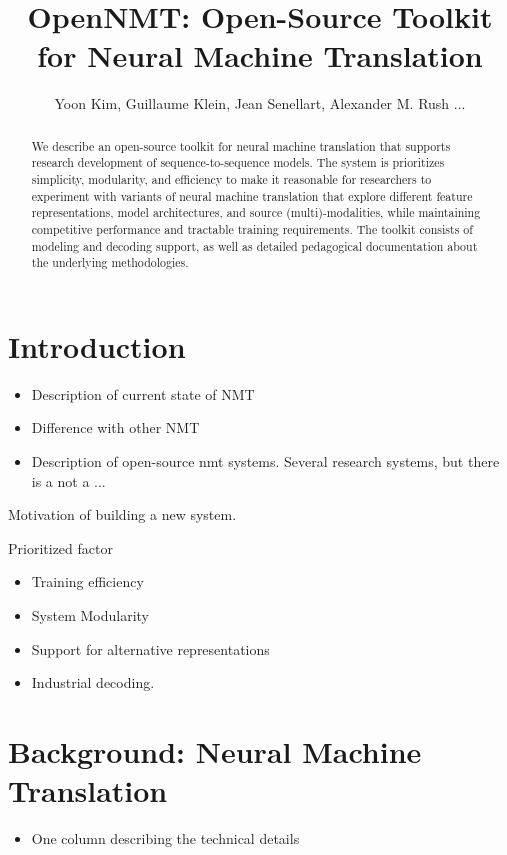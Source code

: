 \documentclass[11pt]{article}
\title{OpenNMT: Open-Source Toolkit for Neural Machine Translation}
\author{Yoon Kim, Guillaume Klein, Jean Senellart, Alexander M. Rush ... }
\date{}
\begin{document}
\maketitle
\begin{abstract}

  We describe an open-source toolkit for neural machine translation
  that supports research development of sequence-to-sequence models.
  The system is prioritizes simplicity, modularity, and efficiency to
  make it reasonable for researchers to experiment with variants of
  neural machine translation that explore different feature
  representations, model architectures, and source (multi)-modalities,
  while maintaining competitive performance and tractable training
  requirements. The toolkit consists of modeling and decoding support,
  as well as detailed pedagogical documentation about the underlying
  methodologies.

\end{abstract}

\section{Introduction}


\begin{itemize}
\item Description of current state of NMT
\item Difference with other NMT
\item Description of open-source nmt systems. Several research systems, but there is a not a ... 
\end{itemize}


Motivation of building a new system.

Prioritized factor 

\begin{itemize}
\item Training efficiency
\item System Modularity
\item Support for alternative representations
\item Industrial decoding.
\end{itemize}


\section{Background: Neural Machine Translation}

\begin{itemize}
\item One column describing the technical details
\end{itemize}
\end{document}
